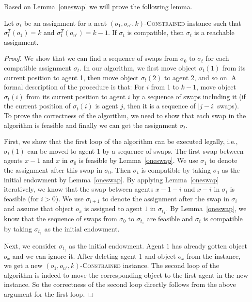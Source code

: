 Based on Lemma~\ref{oneswap} we will prove the following lemma.

\begin{lemma}\label{sufficient}
Let $\sigma _t$ be an assignment for a neat $(o_1,o_{n'},k)$-\textsc{Constrained} instance
such that $\sigma^T_t(o_1)=k$ and $\sigma^T_t(o_{n'})=k-1$.
If $\sigma _t$ is compatible, then $\sigma _t$ is a reachable assignment.
\end{lemma}
\begin{proof}
We show that we can find a sequence of swaps from $\sigma_0$ to $\sigma_t$ for each compatible assignment $\sigma _t$.
In our algorithm, we first move object $\sigma _t(1)$ from its current position to agent 1, then move object $\sigma _t(2)$ to agent 2, and so on.
A formal description of the procedure is that:
For $i$ from 1 to $k-1$, move object $\sigma _t(i)$ from its current position to agent $i$ by a sequence of
    swaps including it (if the current position of $\sigma _t(i)$ is agent $j$, then it is a sequence of $|j-i|$ swaps).
To prove the correctness of the algorithm, we need to show that each swap in the algorithm is feasible and finally we can get the assignment $\sigma _t$.

     First, we show that the first loop of the algorithm can be executed legally, i.e., $\sigma _t(1)$ can be moved to agent 1 by a sequence of swaps. The first swap between agents $x-1$ and $x$ in $\sigma_0$ is feasible by Lemma~\ref{oneswap}.
    We use $\sigma _1$ to denote the assignment after this swap in $\sigma_0$. Then  $\sigma _t$ is compatible by taking $\sigma _{1}$ as the initial endowment by Lemma~\ref{oneswap}. By applying Lemma~\ref{oneswap} iteratively,
    we know that the swap between agents $x-1-i$ and $x-i$ in $\sigma_i$ is feasible (for $i>0$).
    We use
    $\sigma _{i+1}$ to denote the assignment after the swap in $\sigma_i$ and assume that object $o_{x}$ is assigned to agent $1$ in $\sigma _{t_1}$.
    By Lemma~\ref{oneswap}, we know that the sequence of swaps from $\sigma_0$ to $\sigma_{t_1}$ are feasible and
    $\sigma _t$ is compatible by taking $\sigma _{t_1}$ as the initial endowment.

    Next, we consider  $\sigma _{t_1}$ as the initial endowment. Agent $1$ has already gotten object $o_x$ and we can ignore it. After deleting agent 1 and object $o_x$ from the instance, we get a new $(o_1,o_{n'},k)$-\textsc{Constrained} instance.
    The second loop of the algorithm is indeed to move the corresponding object to the first agent in the new instance.
    So the correctness of the second loop directly follows from the above argument for the first loop.


\end{proof}
